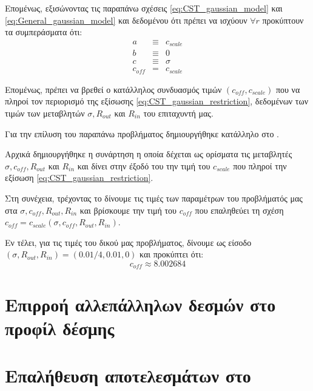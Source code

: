 Επομένως, εξισώνοντας τις παραπάνω σχέσεις \ref{eq:CST_gaussian_model} και \ref{eq:General_gaussian_model} και δεδομένου ότι πρέπει να ισχύουν $\forall r$ προκύπτουν τα συμπεράσματα ότι:
\begin{eqnarray}
a &\equiv & c_{scale}\nonumber \\
b &\equiv &0\nonumber \\
c &\equiv & \sigma \nonumber \\
c_{off} &=&  c_{scale} 
\end{eqnarray}

Επομένως, πρέπει να βρεθεί ο κατάλληλος συνδυασμός τιμών $\left(c_{off}, c_{scale}\right)$ που να πληροί τον περιορισμό της εξίσωσης \ref{eq:CST_gaussian_restriction}, δεδομένων των τιμών των μεταβλητών $\sigma, R_{out}$ και $R_{in}$ του επιταχυντή μας.

Για την επίλυση του παραπάνω προβλήματος δημιουργήθηκε κατάλληλο  στο . 

Αρχικά δημιουργήθηκε η συνάρτηση  η οποία δέχεται ως ορίσματα τις μεταβλητές $\sigma, c_{off}, R_{out}$ και $R_{in}$ και δίνει στην έξοδό του την τιμή του $c_{scale}$ που πληροί την εξίσωση \ref{eq:CST_gaussian_restriction}.

Στη συνέχεια, τρέχοντας το   δίνουμε τις τιμές των παραμέτρων του προβλήματός μας στα $\sigma, c_{off}, R_{out}, R_{in}$ και βρίσκουμε την τιμή του $c_{off}$ που επαληθεύει τη σχέση $c_{off} = c_{scale} \left(\sigma, c_{off}, R_{out}, R_{in} \right)$.




Εν τέλει, για τις τιμές του δικού μας προβλήματος, δίνουμε ως είσοδο $\left(\sigma, R_{out}, R_{in} \right) = \left(0.01/4,0.01, 0 \right)$ και προκύπτει ότι:
\begin{equation}
c_{off} \approx 8.002684
\end{equation}

\section{Επιρροή αλλεπάλληλων δεσμών στο προφίλ δέσμης}

\section{Επαλήθευση αποτελεσμάτων στο }

